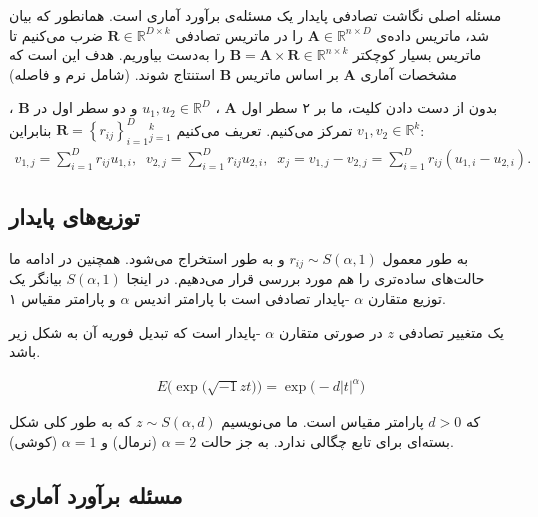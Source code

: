 مسئله اصلی نگاشت تصادفی پایدار یک مسئله‌ی برآورد آماری است. همانطور که بیان شد، ماتریس داده‌ی 
$\mathbf{A} \in \mathbb{R}^{n \times D}$
را در ماتریس تصادفی 
$\mathbf{R} \in \mathbb{R}^{D \times k}$
ضرب می‌کنیم تا ماتریس بسیار کوچکتر 
$\mathbf{B} = \mathbf{A} \times \mathbf{R} \in \mathbb{R}^{n \times k}$
را به‌دست بیاوریم. هدف این است که مشخصات آماری 
$\mathbf{A}$
بر اساس ماتریس 
$\mathbf{B}$
استنتاج شوند. (شامل نرم و فاصله)

بدون از دست دادن کلیت، ما بر ۲ سطر اول 
$\mathbf{A}$
، 
$u_1, u_2 \in \mathbb{R}^D$
و دو سطر اول در 
$\mathbf{B}$
،
$v_1, v_2 \in \mathbb{R}^k$
تمرکز می‌کنیم. تعریف می‌کنیم
$ \mathbf{R} = \left \{ r_{ij} \right \}_{i=1}^D {}_{j=1}^{k}$
بنابراین:
\begin{align}
v_{1,j} = \sum_{i=1}^{D} r_{ij}u_{1,i},\;\;
v_{2,j} = \sum_{i=1}^{D} r_{ij}u_{2,i},\;\;
x_j = v_{1,j} - v_{2,j} = \sum_{i=1}^D r_{ij}(u_{1,i} - u_{2,i}).
\label{eq:1hm}
\end{align}

\subsection{
توزیع‌های پایدار
}

به طور معمول 
$r_{ij} \sim S(\alpha, 1)$
 و به طور 
استخراج می‌شود. همچنین در ادامه ما حالت‌های ساده‌تری را هم مورد بررسی قرار می‌دهیم. در اینجا 
$S(\alpha, 1)$
بیانگر یک توزیع متقارن 
$\alpha$
-پایدار تصادفی است
\cite{litez171}
با پارامتر اندیس 
$\alpha$
و پارامتر مقیاس ۱.

یک متغییر تصادفی 
$z$
در صورتی متقارن  
$\alpha$
-پایدار است که تبدیل فوریه آن به شکل زیر باشد.

\begin{align}
E \big( \exp  \big( \sqrt{-1}zt \big)  \big) = \exp \big( -d |t|^\alpha \big)
\label{eq:1hn}
\end{align}

که 
$d>0$
پارامتر مقیاس است. ما می‌نویسیم 
$z \sim S(\alpha, d)$
که به طور کلی شکل بسته‌ای برای تابع چگالی ندارد. به جز حالت 
$\alpha = 2$
(نرمال) و 
$\alpha = 1$
(کوشی).


\subsection{
مسئله برآورد آماری
}

